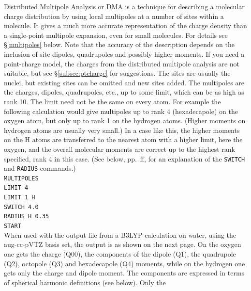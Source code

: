 \documentclass[12pt,txfonts]{paper}
\begin{document}
Distributed Multipole Analysis or DMA is a technique for describing a
molecular charge distribution by using
local multipoles at a number of sites within a molecule. It gives a
much more accurate representation of the charge density than a
single-point multipole expansion, even for small molecules. For
details see \S\ref{multipoles} below. Note that the accuracy of the
description depends on the inclusion of site dipoles, quadrupoles and
possibly higher moments. If you need a point-charge model, the charges from the
distributed multipole analysis are not suitable, but see
\S\ref{subsec:ptcharge} for suggestions. The sites
are usually the nuclei, but existing sites can be omitted and
new sites added. The multipoles are the charges,
dipoles, quadrupoles, etc., up to some limit, which can be as high as
rank 10. The limit need not be the same on every atom. For example the
following 
calculation would give multipoles up to rank 4 (hexadecapole) on the
oxygen atom, but only up to rank 1 on the hydrogen atoms. (Higher
moments on hydrogen atoms are usually very small.) In a case like
this, the higher moments on the H atoms are
transferred to the nearest atom with a higher limit, here the oxygen,
and the overall molecular moments are correct up to the highest rank
specified, rank 4 in this case. (See below, pp.~\pageref{p:switch}ff, for
an explanation of the \verb+SWITCH+ and \verb+RADIUS+ commands.)\\
\hspace*{2 em}\verb/MULTIPOLES/\\
\hspace*{2 em}\verb/LIMIT 4/\\
\hspace*{2 em}\verb/LIMIT 1 H/\\
\hspace*{2 em}\verb/SWITCH 4.0/\\
\hspace*{2 em}\verb/RADIUS H 0.35/\\
\hspace*{2 em}\verb/START/\\
When used with the output file from a B3LYP calculation on water,
using the aug-cc-pVTZ basis set, the
output is as shown %
on the next page.  On the oxygen one gets the
charge (Q00), the components of the dipole (Q1), the quadrupole (Q2),
octopole (Q3) and hexadecapole (Q4) moments, while on the hydrogen one
gets only the charge and dipole moment. The components are expressed 
in terms of spherical harmonic definitions (see below). Only the
\end{document}
